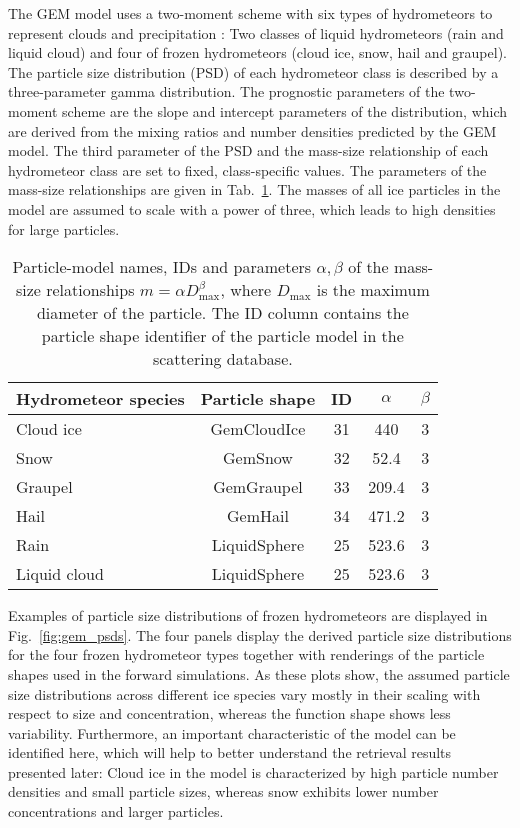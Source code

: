 \documentclass[journal abbreviation, manuscript]{copernicus}
\begin{document}
The GEM model uses a two-moment scheme with six types of hydrometeors to
represent clouds and precipitation \citep{milbrandtyau05}: Two classes of liquid
hydrometeors (rain and liquid cloud) and four of frozen hydrometeors (cloud ice,
snow, hail and graupel). The particle size distribution (PSD) of each
hydrometeor class is described by a three-parameter gamma distribution. The
prognostic parameters of the two-moment scheme are the slope and intercept
parameters of the distribution, which are derived from the mixing ratios and
number densities predicted by the GEM model. The third parameter of the PSD and
the mass-size relationship of each hydrometeor class are set to fixed,
class-specific values. The parameters of the mass-size relationships are given
in Tab.~\ref{tab:species_parameters}. The masses of all ice particles in the
model are assumed to scale with a power of three, which leads to high densities
for large particles.

\begin{table}
  \centering
  \caption{Particle-model names, IDs and parameters $\alpha, \beta$ of the
    mass-size relationships $m = \alpha D_\text{max}^\beta$, where
    $D_\text{max}$ is the maximum diameter of the particle. The ID column
    contains the particle shape identifier of the particle model in the
    \citet{eriksson18} scattering database.}
  \label{tab:species_parameters}
  \begin{tabular}{l|c|c|c|c}
    Hydrometeor species & Particle shape & ID & $\alpha$ & $\beta$ \\
    \hline
    Cloud ice    & GemCloudIce  & 31 & 440   & 3 \\
    Snow         & GemSnow      & 32 & 52.4  & 3 \\
    Graupel      & GemGraupel   & 33 & 209.4 & 3 \\
    Hail         & GemHail      & 34 & 471.2 & 3 \\
    Rain         & LiquidSphere & 25 & 523.6 & 3 \\
    Liquid cloud & LiquidSphere & 25 & 523.6 & 3 \\
  \end{tabular}
\end{table}

Examples of particle size distributions of frozen hydrometeors are displayed in
Fig.~\ref{fig:gem_psds}. The four panels display the derived particle size
distributions for the four frozen hydrometeor types together with renderings of
the particle shapes used in the forward simulations. As these plots show, the
assumed particle size distributions across different ice species vary mostly in
their scaling with respect to size and concentration, whereas the function shape shows less
variability. Furthermore, an important characteristic of the model can be
identified here, which will help to better understand the retrieval results
presented later: Cloud ice in the model is characterized by high particle number
densities and small particle sizes, whereas snow exhibits lower number
concentrations and larger particles.
\end{document}
